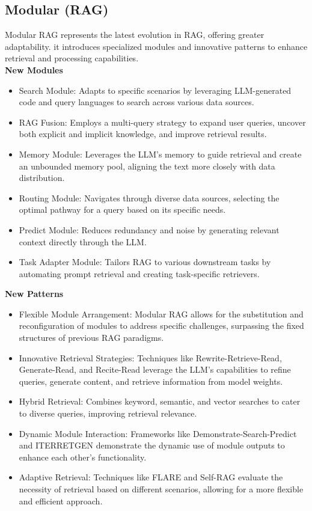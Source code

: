 \subsection{Modular (RAG)} 
Modular RAG represents the latest evolution in RAG, offering greater adaptability. it introduces specialized modules and innovative patterns to enhance retrieval and processing capabilities.\\
\textbf{New Modules}
\begin{itemize}
	\item Search Module: Adapts to specific scenarios by leveraging LLM-generated code and query languages to search across various data sources.
	\item RAG Fusion: Employs a multi-query strategy to expand user queries, uncover both explicit and implicit knowledge, and improve retrieval results.
	\item Memory Module: Leverages the LLM's memory to guide retrieval and create an unbounded memory pool, aligning the text more closely with data distribution.
	\item Routing Module: Navigates through diverse data sources, selecting the optimal pathway for a query based on its specific needs.
	\item Predict Module: Reduces redundancy and noise by generating relevant context directly through the LLM.
	\item Task Adapter Module: Tailors RAG to various downstream tasks by automating prompt retrieval and creating task-specific retrievers.
\end{itemize}
\textbf{New Patterns} 
\begin{itemize}
	\item Flexible Module Arrangement: Modular RAG allows for the substitution and reconfiguration of modules to address specific challenges, surpassing the fixed structures of previous RAG paradigms.
	\item Innovative Retrieval Strategies: Techniques like Rewrite-Retrieve-Read, Generate-Read, and Recite-Read leverage the LLM's capabilities to refine queries, generate content, and retrieve information from model weights.
	\item Hybrid Retrieval: Combines keyword, semantic, and vector searches to cater to diverse queries, improving retrieval relevance.
	\item Dynamic Module Interaction: Frameworks like Demonstrate-Search-Predict and ITERRETGEN demonstrate the dynamic use of module outputs to enhance each other's functionality.
	\item Adaptive Retrieval: Techniques like FLARE and Self-RAG evaluate the necessity of retrieval based on different scenarios, allowing for a more flexible and efficient approach.
	
\end{itemize}
